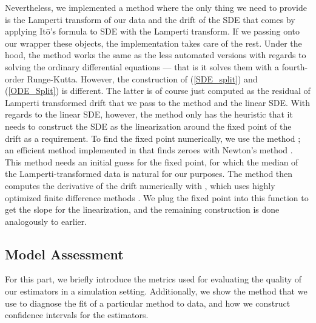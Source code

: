 Nevertheless, we implemented a method where the only thing we need to provide is the Lamperti transform of our data and the drift of the SDE that comes by applying Itō's formula to SDE with the Lamperti transform. If we passing onto our wrapper these objects, the implementation takes care of the rest. Under the hood, the method works the same as the less automated versions with regards to solving the ordinary differential equations — that is it solves them with a fourth-order Runge-Kutta. However, the construction of (\ref{SDE_split}) and (\ref{ODE_Split}) is different. The latter is of course just computed as the residual of Lamperti transformed drift that we pass to the method and the linear SDE. With regards to the linear SDE, however, the method only has the heuristic that it needs to construct the SDE as the linearization around the fixed point of the drift as a requirement. To find the fixed point numerically, we use the method ; an efficient method implemented in  that finds zeroes with Newton's method \cite{nleqslv}. This method needs an initial guess for the fixed point, for which the median of the Lamperti-transformed data is natural for our purposes. The method then computes the derivative of the drift numerically with , which uses highly optimized finite difference methods \cite{numDeriv}. We plug the fixed point into this function to get the slope for the linearization, and the remaining construction is done analogously to earlier.
\subsection{Model Assessment}
For this part, we briefly introduce the metrics used for evaluating the quality of our estimators in a simulation setting. Additionally, we show the method that we use to diagnose the fit of a particular method to data, and how we construct confidence intervals for the estimators.

